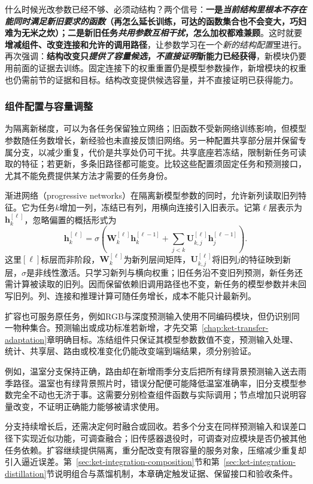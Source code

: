 什么时候光改参数已经不够、必须动结构？两个信号：\textbf{一是\emph{当前结构里\emph{根本不存在}能同时满足新旧要求的函数}（再怎么延长训练，可达的函数集合也不会变大，巧妇难为无米之炊）；二是新旧任务\emph{共用参数互相干扰}，怎么加权都难兼顾}。这时就要\textbf{增减组件、改变连接和允许的调用路径}，让参数学习在一个\emph{新的结构配置}里进行。再次强调：\textbf{结构改变只\emph{提供了容量候选}，\emph{不直接证明}新能力已经获得}，新模块仍要用前面的证据去训练。固定连接下的权重重置仍是模型参数操作，新增模块的权重也仍需前节的证据和目标。结构改变提供候选容量，并不直接证明已获得能力。

\subsubsection{组件配置与容量调整}
\label{sec:ket-update-capacity}

为隔离新梯度，可以为各任务保留独立网络；旧函数不受新网络训练影响，但模型参数随任务数增长，新经验也未直接反馈旧网络。另一种配置共享部分层并保留专属分支，以减少重复，代价是共享处仍可干扰。共享底座若冻结，限制新任务可读取的特征；若更新，多条旧路径都可能变。比较这些配置须固定任务和预测接口，尤其不能免费提供某方法才需要的任务身份。

渐进网络（progressive networks）在隔离新模型参数的同时，允许新列读取旧列特征。它为任务$k$增加一列，冻结已有列，用横向连接引入旧表示。记第$\ell$层表示为$\bm h_k^{[\ell]}$，忽略偏置的概括形式为
\[
\bm h_k^{[\ell]}
=\sigma\!\left(
\bm W_k^{[\ell]}\bm h_k^{[\ell-1]}
+\sum_{j<k}\bm U_{k,j}^{[\ell]}\bm h_j^{[\ell-1]}
\right).
\]
这里$[\ell]$标层而非阶段，$\bm W_k^{[\ell]}$为新列层间矩阵，$\bm U_{k,j}^{[\ell]}$将旧列$j$的特征映到新层，$\sigma$是非线性激活。只学习新列与横向权重；旧任务沿不变旧列预测，新任务还需计算被读取的旧列。因而保留依赖旧调用路径也不变，新任务的模型参数并未回写旧列。列、连接和推理计算可随任务增长，成本不能只计最新列。

扩容也可服务原任务，例如RGB与深度预测输入使用不同编码模块，但仍识别同一物种集合。预测输出或成功标准若新增，才先交第~\ref{chap:ket-transfer-adaptation}章明确目标。冻结组件只保证其模型参数数值不变，预测输入处理、统计、共享层、路由或校准变化仍能改变端到端结果，须分别验证。

例如，温室分支保持正确，路由却在新增雨季分支后把所有绿背景预测输入送去雨季路径。温室也有绿背景照片时，错误分配便可能降低温室准确率，旧分支模型参数完全不动也无济于事。这需要分别检查组件函数与实际调用；节点增加只说明容量改变，不证明正确能力能够被请求使用。

分支持续增长后，还需决定何时融合或回收。若多个分支在同样预测输入和误差口径下实现近似功能，可调查融合；旧传感器退役时，可调查对应模块是否仍被其他任务依赖。扩容继续提供隔离，重分配改变有限容量的服务对象，压缩减少重复却引入逼近误差。第~\ref{sec:ket-integration-composition}节和第~\ref{sec:ket-integration-distillation}节说明组合与蒸馏机制，本章确定触发证据、保留接口和验收条件。

